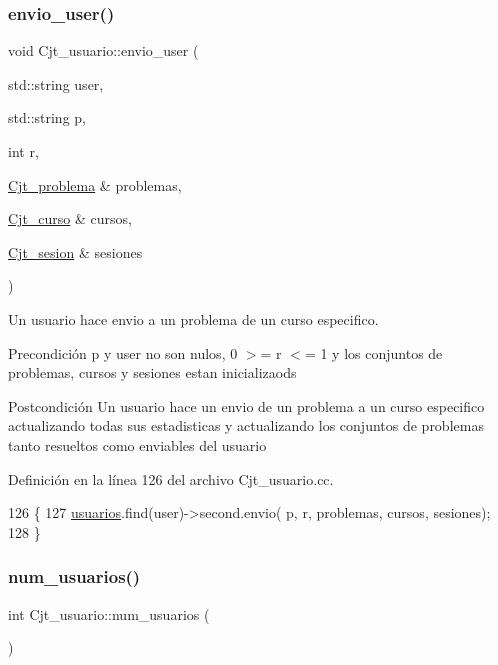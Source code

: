 \subsubsection{\texorpdfstring{envio\+\_\+user()}{envio\_user()}}
{\footnotesize\ttfamily void Cjt\+\_\+usuario\+::envio\+\_\+user (\begin{DoxyParamCaption}\item[{std\+::string}]{user,  }\item[{std\+::string}]{p,  }\item[{int}]{r,  }\item[{\mbox{\hyperlink{class_cjt__problema}{Cjt\+\_\+problema}} \&}]{problemas,  }\item[{\mbox{\hyperlink{class_cjt__curso}{Cjt\+\_\+curso}} \&}]{cursos,  }\item[{\mbox{\hyperlink{class_cjt__sesion}{Cjt\+\_\+sesion}} \&}]{sesiones }\end{DoxyParamCaption})}



Un usuario hace envio a un problema de un curso especifico. 

\begin{DoxyPrecond}{Precondición}
p y user no son nulos, 0 $>$= r $<$= 1 y los conjuntos de problemas, cursos y sesiones estan inicializaods 
\end{DoxyPrecond}
\begin{DoxyPostcond}{Postcondición}
Un usuario hace un envio de un problema a un curso especifico actualizando todas sus estadisticas y actualizando los conjuntos de problemas tanto resueltos como enviables del usuario 
\end{DoxyPostcond}


Definición en la línea 126 del archivo Cjt\+\_\+usuario.\+cc.


\begin{DoxyCode}
126                                                                                                            
                      \{
127   \mbox{\hyperlink{class_cjt__usuario_af814d06f1c52bc2e744d253d20ce6e6b}{usuarios}}.find(user)->second.envio( p,  r, problemas, cursos, sesiones);
128 \}
\end{DoxyCode}
\mbox{\label{class_cjt__usuario_a92ec4442d4a6e8d50f4eb36413ade07e}} 
\subsubsection{\texorpdfstring{num\+\_\+usuarios()}{num\_usuarios()}}
{\footnotesize\ttfamily int Cjt\+\_\+usuario\+::num\+\_\+usuarios (\begin{DoxyParamCaption}{ }\end{DoxyParamCaption})}



